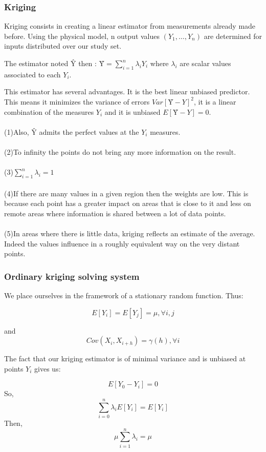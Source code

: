 \documentclass[hidelinks,12pt]{article}
\begin{document}
\subsubsection{Kriging}

Kriging consists in creating a linear estimator from measurements already made before. Using the physical model, n output values $(Y_1,\ldots,Y_n)$ are determined for inputs distributed over our study set. 

The estimator noted Ŷ then : $Ŷ=\sum_{i=1}^{n}\lambda_i Y_i$ where $\lambda_i$ are scalar values associated to each $Y_i$.

This estimator has several advantages. It is the best linear unbiased predictor. This means it minimizes the variance of errors $Var[Ŷ-Y]^2$, it is a linear combination of the measures $Y_i$ and it is unbiased $E[Ŷ-Y]=0$.
\\
\\
(1)Also, Ŷ admits the perfect values at the $Y_i$ measures.
\\
\\
(2)To infinity the points do not bring any more information on the result.
\\
\\
(3)$\sum_{i=1}^{n}\lambda_i=1$
\\
\\
(4)If there are many values in a given region then the weights are low. This is because each point has a greater impact on areas that is close to it and less on remote areas where information is shared between a lot of data points.
\\
\\
(5)In areas where there is little data, kriging reflects an estimate of the average. Indeed the values influence in a roughly equivalent way on the very distant points.

\subsubsection{Ordinary kriging solving system}
We place ourselves in the framework of a stationary random function. Thus:

$$E[Y_i]=E[Y_j]=\mu, \forall i,j$$

and $$Cov(X_i,X_{i+h})=\gamma(h), \forall i$$

The fact that our kriging estimator is of minimal variance and is unbiased at points $Y_i$ gives us:

$$E[Y_0-Y_i]=0$$
So, $$\sum_{i=0}^{n}\lambda_iE[Y_i]=E[Y_i]$$
Then, $$\mu \sum_{i=1}^{n}\lambda_i = \mu$$
\end{document}

